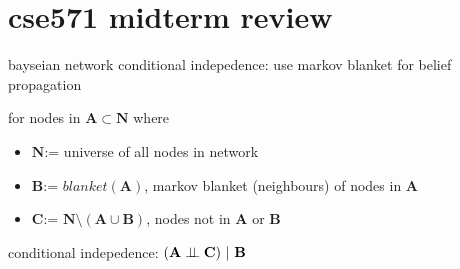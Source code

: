 \documentclass[10pt]{article}
\begin{document}
 \noindent

\section*{cse571 midterm review}

bayseian network conditional indepedence: use markov blanket for belief propagation
\hspace{2em}
\begin{minipage}[b]{0.6\textwidth}
    for nodes in $\mathbf{A} \subset \mathbf{N}$ where
    \begin{itemize}[leftmargin=1em, itemsep=-0.3em]
        \item[] $\mathbf{N}$:= universe of all nodes in network
        \item[] $\mathbf{B}$:= $blanket(\mathbf{A})$, markov blanket (neighbours) of nodes in $\mathbf{A}$
        \item[] $\mathbf{C}$:= $\mathbf{N}\setminus(\mathbf{A} \cup \mathbf{B})$, nodes not in $\mathbf{A}$ or $\mathbf{B}$
    \end{itemize}
    conditional indepedence: $(\mathbf{A}\condind \mathbf{C})\ |\ \mathbf{B}$\\
\end{minipage}
\begin{minipage}[b]{0.2\textwidth} \footnotesize
\end{minipage}
\end{document}
